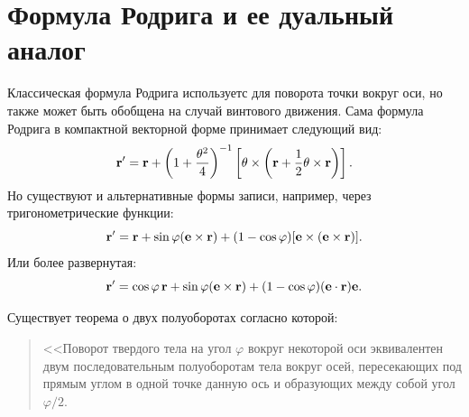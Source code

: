 \section{Формула Родрига и ее дуальный аналог}
\label{sec:Rodrig}

Классическая формула Родрига используетс для поворота точки вокруг оси, но также может быть обобщена на случай винтового движения. Сама формула Родрига в компактной векторной форме принимает следующий вид:
\begin{equation*}
    \vb{r}' = \vb{r} + \left(1 + \frac{\theta^2}{4}\right)^{-1} \left[ \vb{\theta} \times \left( \vb{r} + \frac{1}{2} \vb{\theta} \times \vb{r} \right) \right].
\end{equation*}
Но существуют и альтернативные формы записи, например, через тригонометрические функции:
\begin{equation*}
    \vb{r}' = \vb{r} + \sin \varphi (\vb{e} \times \vb{r}) + (1 - \cos \varphi) [\vb{e} \times (\vb{e} \times \vb{r})].
\end{equation*}
Или более развернутая:
\begin{equation*}
    \vb{r}' = \cos \varphi \, \vb{r} + \sin \varphi (\vb{e} \times \vb{r}) + (1 - \cos \varphi)(\vb{e} \cdot \vb{r})\vb{e}.
\end{equation*}

Существует теорема о двух полуоборотах согласно которой:
\begin{quote}
    <<Поворот твердого тела на угол \( \varphi \) вокруг некоторой оси эквивалентен двум последовательным полуоборотам тела вокруг осей, пересекающих под прямым углом в одной точке данную ось и образующих между собой угол $\varphi/2$.
\end{quote}

